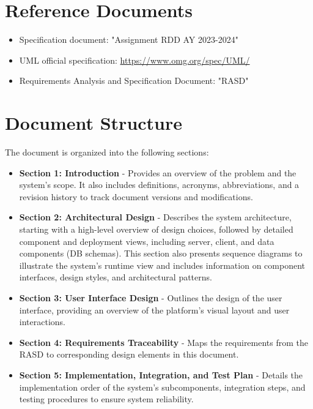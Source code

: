 \section{Reference Documents}
\begin{itemize}
    \item Specification document: "Assignment RDD AY 2023-2024"
    \item UML official specification: \url{https://www.omg.org/spec/UML/}
    \item Requirements Analysis and Specification Document: "RASD"
\end{itemize}

\section{Document Structure}
The document is organized into the following sections:
\begin{itemize}
    \item \textbf{Section 1: Introduction} - Provides an overview of the problem and the system's scope. It also includes definitions, acronyms, abbreviations, and a revision history to track document versions and modifications.
    \item \textbf{Section 2: Architectural Design} - Describes the system architecture, starting with a high-level overview of design choices, followed by detailed component and deployment views, including server, client, and data components (DB schemas). This section also presents sequence diagrams to illustrate the system’s runtime view and includes information on component interfaces, design styles, and architectural patterns.
    \item \textbf{Section 3: User Interface Design} - Outlines the design of the user interface, providing an overview of the platform’s visual layout and user interactions.
    \item \textbf{Section 4: Requirements Traceability} - Maps the requirements from the RASD to corresponding design elements in this document.
    \item \textbf{Section 5: Implementation, Integration, and Test Plan} - Details the implementation order of the system’s subcomponents, integration steps, and testing procedures to ensure system reliability.
\end{itemize}

